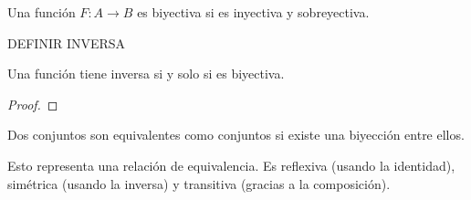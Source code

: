 \documentclass[main.tex]{subfiles}
\begin{document}
\begin{defn}
    Una funci\'on $F: A \to B$ es biyectiva si es inyectiva y sobreyectiva.
\end{defn}

\begin{defn}
    DEFINIR INVERSA
\end{defn}

\begin{theorem}
    Una funci\'on tiene inversa si y solo si es biyectiva.
\end{theorem}

\begin{proof}

\end{proof}

\begin{defn}
    Dos conjuntos son equivalentes como conjuntos si existe una biyecci\'on entre ellos.
\end{defn}

\begin{note}
    Esto representa una relaci\'on de equivalencia. Es reflexiva (usando la identidad), sim\'etrica (usando la inversa) y transitiva (gracias a la composici\'on).
\end{note}
\end{document}
